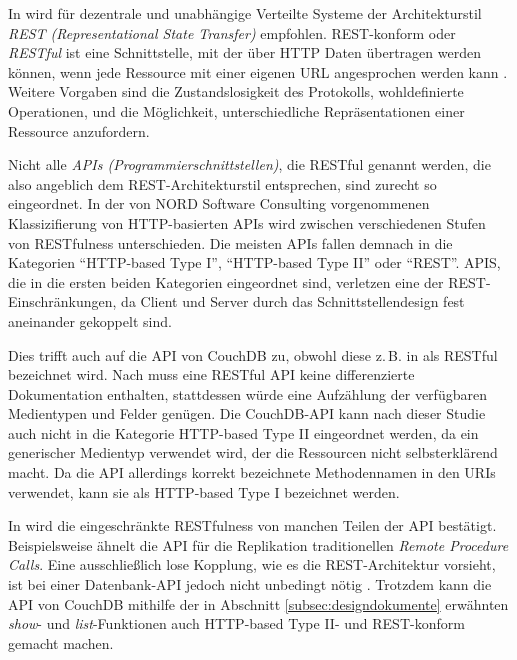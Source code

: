 In  wird für dezentrale und unabhängige Verteilte Systeme der Architekturstil \textit{REST (Representational State Transfer)} empfohlen. REST-konform oder \textit{RESTful} ist eine Schnittstelle, mit der über HTTP  Daten übertragen werden können, wenn jede Ressource mit einer eigenen URL angesprochen werden kann . Weitere Vorgaben sind die Zustandslosigkeit des Protokolls, wohldefinierte Operationen, und die Möglichkeit, unterschiedliche Repräsentationen einer Ressource anzufordern. 

Nicht alle \textit{APIs (Programmierschnittstellen)}, die RESTful genannt werden, die also angeblich dem REST-Architekturstil entsprechen, sind zurecht so eingeordnet. In der von NORD Software Consulting vorgenommenen Klassizifierung von HTTP-basierten APIs \cite{rest:classification} wird zwischen verschiedenen Stufen von RESTfulness unterschieden. Die meisten APIs fallen demnach in die Kategorien \enquote{HTTP-based Type I}, \enquote{HTTP-based Type II} oder \enquote{REST}. APIS, die in die ersten beiden Kategorien eingeordnet sind, verletzen eine der REST-Einschränkungen, da Client und Server durch das Schnittstellendesign fest aneinander gekoppelt sind. 

Dies trifft auch auf die API von CouchDB zu, obwohl diese z.\,B. in  \cite{couch:overview} als RESTful bezeichnet wird. Nach \cite{rest:couchapi} muss eine RESTful API keine differenzierte Dokumentation enthalten, stattdessen würde eine Aufzählung der verfügbaren Medientypen und Felder genügen. Die CouchDB-API kann nach dieser Studie auch nicht in die Kategorie HTTP-based Type II eingeordnet werden, da ein generischer Medientyp verwendet wird, der die Ressourcen nicht selbsterklärend macht. Da die API allerdings korrekt bezeichnete Methodennamen in den URIs verwendet, kann sie als HTTP-based Type I bezeichnet werden. 

In  wird die eingeschränkte RESTfulness von manchen Teilen der API bestätigt. Beispielsweise ähnelt die API für die Replikation traditionellen \textit{Remote Procedure Calls}. Eine ausschließlich lose Kopplung, wie es die REST-Architektur vorsieht, ist bei einer Datenbank-API jedoch nicht unbedingt nötig \cite{rest:couchapi}. Trotzdem kann die API von CouchDB mithilfe der in Abschnitt \ref{subsec:designdokumente} erwähnten \textit{show}- und \textit{list}-Funktionen auch HTTP-based Type II- und REST-konform gemacht machen.




